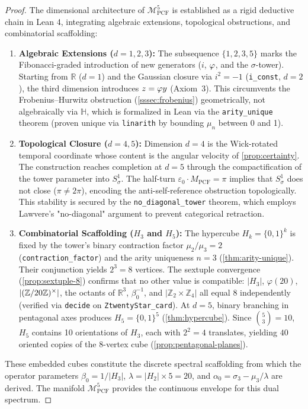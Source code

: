 \begin{proof}
The dimensional architecture of $\mathcal{M}^5_{\mathrm{PCF}}$ is established as a rigid deductive chain in Lean 4, integrating algebraic extensions, topological obstructions, and combinatorial scaffolding:
\begin{enumerate}
    \item \textbf{Algebraic Extensions ($d=1,2,3$):} The subsequence $\{1,2,3,5\}$ marks the Fibonacci-graded introduction of new generators ($i$, $\varphi$, and the $\sigma$-tower). Starting from $\mathbb{R}$ ($d=1$) and the Gaussian closure via $i^2=-1$ (\texttt{i\_const}, $d=2$), the third dimension introduces $z = \varphi y$ (Axiom~3). This circumvents the Frobenius--Hurwitz obstruction (\cref{sssec:frobenius}) geometrically, not algebraically via $\mathbb{H}$, which is formalized in Lean via the \texttt{arity\_unique} theorem (proven unique via \texttt{linarith} by bounding $\mu_n$ between 0 and 1).
    \item \textbf{Topological Closure ($d=4,5$):} Dimension $d=4$ is the Wick-rotated temporal coordinate whose content is the angular velocity of \cref{prop:certainty}. The construction reaches completion at $d=5$ through the compactification of the tower parameter into $S^1_\sigma$. The half-turn $\varepsilon_0 \cdot M_{\mathrm{PCF}} = \pi$ implies that $S^1_\sigma$ does not close ($\pi \neq 2\pi$), encoding the anti-self-reference obstruction topologically. This stability is secured by the \texttt{no\_diagonal\_tower} theorem, which employs Lawvere's "no-diagonal" argument to prevent categorical retraction.
    \item \textbf{Combinatorial Scaffolding ($H_3$ and $H_5$):} The hypercube $H_k = \{0,1\}^k$ is fixed by the tower's binary contraction factor $\mu_2/\mu_3 = 2$ (\texttt{contraction\_factor}) and the arity uniqueness $n=3$ (\cref{thm:arity-unique}). Their conjunction yields $2^3=8$ vertices. The sextuple convergence (\cref{prop:sextuple-8}) confirms that no other value is compatible: $|H_3|$, $\varphi(20)$, $|(\mathbb{Z}/20\mathbb{Z})^\times|$, the octants of $\mathbb{R}^3$, $\beta_0^{-1}$, and $|\mathbb{Z}_2\times\mathbb{Z}_4|$ all equal $8$ independently (verified via \texttt{decide} on \texttt{ZtwentyStar\_card}). At $d=5$, binary branching in pentagonal axes produces $H_5 = \{0,1\}^5$ (\cref{thm:hypercube}). Since $\binom{5}{3}=10$, $H_5$ contains 10 orientations of $H_3$, each with $2^2=4$ translates, yielding $40$ oriented copies of the $8$-vertex cube (\cref{prop:pentagonal-planes}).
\end{enumerate}
These embedded cubes constitute the discrete spectral scaffolding from which the operator parameters $\beta_0 = 1/|H_3|$, $\lambda = |H_2|\times 5 = 20$, and $\alpha_0 = \sigma_3 - \mu_3/\lambda$ are derived. The manifold $\mathcal{M}^5_{\mathrm{PCF}}$ provides the continuous envelope for this dual spectrum.
\end{proof}

